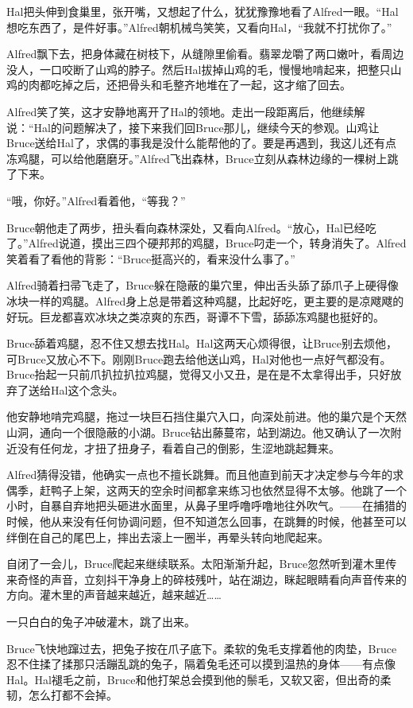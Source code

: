 \documentclass[../main.tex]{subfiles}
\begin{document}
Hal把头伸到食巢里，张开嘴，又想起了什么，犹犹豫豫地看了Alfred一眼。``Hal想吃东西了，是件好事。''Alfred朝机械鸟笑笑，又看向Hal，``我就不打扰你了。''

Alfred飘下去，把身体藏在树枝下，从缝隙里偷看。翡翠龙嚼了两口嫩叶，看周边没人，一口咬断了山鸡的脖子。然后Hal拔掉山鸡的毛，慢慢地啃起来，把整只山鸡的肉都吃掉之后，还把骨头和毛整齐地堆在了一起，这才缩了回去。

Alfred笑了笑，这才安静地离开了Hal的领地。走出一段距离后，他继续解说：``Hal的问题解决了，接下来我们回Bruce那儿，继续今天的参观。山鸡让Bruce送给Hal了，求偶的事我是没什么能帮他的了。要是再遇到，我这儿还有点冻鸡腿，可以给他磨磨牙。''Alfred飞出森林，Bruce立刻从森林边缘的一棵树上跳了下来。

``哦，你好。''Alfred看着他，``等我？''

Bruce朝他走了两步，扭头看向森林深处，又看向Alfred。``放心，Hal已经吃了。''Alfred说道，摸出三四个硬邦邦的鸡腿，Bruce叼走一个，转身消失了。Alfred笑着看了看他的背影：``Bruce挺高兴的，看来没什么事了。''

Alfred骑着扫帚飞走了，Bruce躲在隐蔽的巢穴里，伸出舌头舔了舔爪子上硬得像冰块一样的鸡腿。Alfred身上总是带着这种鸡腿，比起好吃，更主要的是凉飕飕的好玩。巨龙都喜欢冰块之类凉爽的东西，哥谭不下雪，舔舔冻鸡腿也挺好的。

Bruce舔着鸡腿，忍不住又想去找Hal。Hal这两天心烦得很，让Bruce别去烦他，可Bruce又放心不下。刚刚Bruce跑去给他送山鸡，Hal对他也一点好气都没有。Bruce抬起一只前爪扒拉扒拉鸡腿，觉得又小又丑，是在是不太拿得出手，只好放弃了送给Hal这个念头。

他安静地啃完鸡腿，拖过一块巨石挡住巢穴入口，向深处前进。他的巢穴是个天然山洞，通向一个很隐蔽的小湖。Bruce钻出藤蔓帘，站到湖边。他又确认了一次附近没有任何龙，才扭了扭身子，看着自己的倒影，生涩地跳起舞来。

Alfred猜得没错，他确实一点也不擅长跳舞。而且他直到前天才决定参与今年的求偶季，赶鸭子上架，这两天的空余时间都拿来练习也依然显得不太够。他跳了一个小时，自暴自弃地把头砸进水面里，从鼻子里呼噜呼噜地往外吹气。------在捕猎的时候，他从来没有任何协调问题，但不知道怎么回事，在跳舞的时候，他甚至可以绊倒在自己的尾巴上，摔出去滚上一圈半，再晕头转向地爬起来。

自闭了一会儿，Bruce爬起来继续联系。太阳渐渐升起，Bruce忽然听到灌木里传来奇怪的声音，立刻抖干净身上的碎枝残叶，站在湖边，眯起眼睛看向声音传来的方向。灌木里的声音越来越近，越来越近\ldots\ldots{}

一只白白的兔子冲破灌木，跳了出来。

Bruce飞快地蹿过去，把兔子按在爪子底下。柔软的兔毛支撑着他的肉垫，Bruce忍不住揉了揉那只活蹦乱跳的兔子，隔着兔毛还可以摸到温热的身体------有点像Hal。Hal褪毛之前，Bruce和他打架总会摸到他的鬃毛，又软又密，但出奇的柔韧，怎么打都不会掉。
\end{document}
